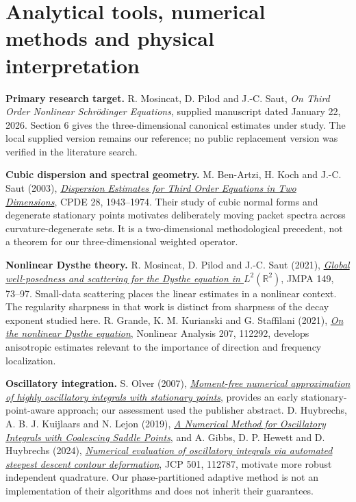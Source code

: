 \documentclass[10pt,letterpaper]{article}
\begin{document}
\section*{Analytical tools, numerical methods and physical interpretation}
\textbf{Primary research target.} R. Mosincat, D. Pilod and J.-C. Saut,
\emph{On Third Order Nonlinear Schr\"odinger Equations}, supplied manuscript dated
January 22, 2026. Section 6 gives the three-dimensional canonical estimates under
study. The local supplied version remains our reference; no public replacement
version was verified in the literature search.

\textbf{Cubic dispersion and spectral geometry.} M. Ben-Artzi, H. Koch and
J.-C. Saut (2003), \href{https://doi.org/10.1081/PDE-120025491}{\emph{Dispersion Estimates
for Third Order Equations in Two Dimensions}}, CPDE 28, 1943--1974. Their study of
cubic normal forms and degenerate stationary points motivates deliberately moving
packet spectra across curvature-degenerate sets. It is a two-dimensional methodological
precedent, not a theorem for our three-dimensional weighted operator.

\textbf{Nonlinear Dysthe theory.} R. Mosincat, D. Pilod and J.-C. Saut (2021),
\href{https://arxiv.org/abs/2007.01613}{\emph{Global well-posedness and scattering for
the Dysthe equation in $L^2(\mathbb R^2)$}}, JMPA 149, 73--97. Small-data scattering
places the linear estimates in a nonlinear context. The regularity sharpness in
that work is distinct from sharpness of the decay exponent studied here.
R. Grande, K. M. Kurianski and G. Staffilani (2021),
\href{https://arxiv.org/abs/2006.13392}{\emph{On the nonlinear Dysthe equation}},
Nonlinear Analysis 207, 112292, develops anisotropic estimates relevant to the
importance of direction and frequency localization.

\textbf{Oscillatory integration.} S. Olver (2007),
\href{https://www.cambridge.org/core/journals/european-journal-of-applied-mathematics/article/abs/momentfree-numerical-approximation-of-highly-oscillatory-integrals-with-stationary-points/0E02A1874E775BB219E5A2CE2DC0221B}{\emph{Moment-free numerical approximation of highly oscillatory integrals with stationary points}},
provides an early stationary-point-aware approach; our assessment used the publisher abstract.
D. Huybrechs, A. B. J. Kuijlaars and N. Lejon (2019),
\href{https://arxiv.org/abs/1806.06549}{\emph{A Numerical Method for Oscillatory Integrals
with Coalescing Saddle Points}}, and A. Gibbs, D. P. Hewett and D. Huybrechs (2024),
\href{https://arxiv.org/abs/2307.07261}{\emph{Numerical evaluation of oscillatory integrals
via automated steepest descent contour deformation}}, JCP 501, 112787, motivate
more robust independent quadrature. Our phase-partitioned adaptive method is not
an implementation of their algorithms and does not inherit their guarantees.
\end{document}
